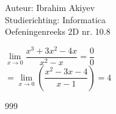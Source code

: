 \documentclass[a4paper]{article}
\begin{document}
  
\noindent \large Auteur: Ibrahim Akiyev \\
\noindent \large Studierichting:  Informatica\\
\noindent \large Oefeningenreeks 2D nr. 10.8\\

\medskip

\normalsize

$\lim\limits_{x \to 0} \dfrac{x^3 + 3x^2 -4x}{x^2 -x} = \dfrac{0}{0}$\\

$= \lim\limits_{x \to 0}  \left(\dfrac{x^2 -3x -4}{x-1}\right) = 4$\\

\begin{thebibliography}{999}
\end{thebibliography}
\end{document}
